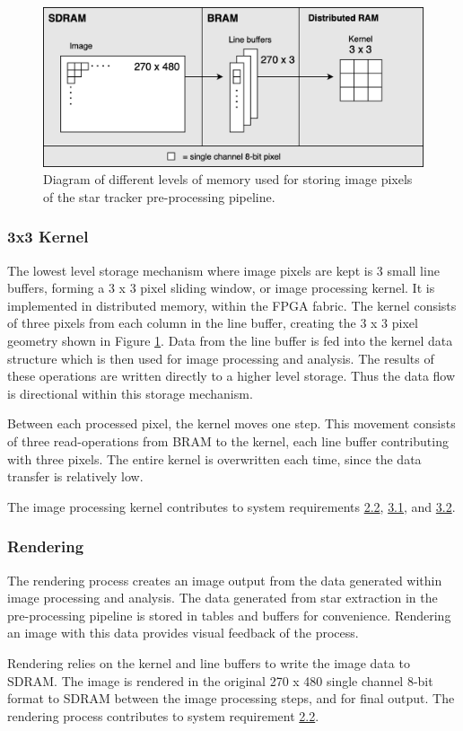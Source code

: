 \documentclass[12pt]{report}
\begin{document}
\begin{figure}[h]
    \centering
    \includegraphics[scale=0.3]{figures/mem_overview.png}
    \caption{Diagram of different levels of memory used for storing image pixels of the star tracker pre-processing pipeline.}
    \label{fig:mem_overview}
\end{figure}

\subsubsection{3x3 Kernel}
The lowest level storage mechanism where image pixels are kept is 3 small line buffers, forming a 3 x 3 pixel sliding window, or image processing kernel. It is implemented in distributed memory, within the FPGA fabric. The kernel consists of three pixels from each column in the line buffer, creating the 3 x 3 pixel geometry shown in Figure \ref*{fig:mem_overview}. Data from the line buffer is fed into the kernel data structure which is then used for image processing and analysis. The results of these operations are written directly to a higher level storage. Thus the data flow is directional within this storage mechanism.
\par
Between each processed pixel, the kernel moves one step. This movement consists of three read-operations from BRAM to the kernel, each line buffer contributing with three pixels. The entire kernel is overwritten each time, since the data transfer is relatively low.
\par
The image processing kernel contributes to system requirements \hyperref[req2.2]{2.2}, \hyperref[req3.1]{3.1}, and \hyperref[req3.2]{3.2}.

\subsubsection{Rendering}
The rendering process creates an image output from the data generated within image processing and analysis. The data generated from star extraction in the pre-processing pipeline is stored in tables and buffers for convenience. Rendering an image with this data provides visual feedback of the process.
\par
Rendering relies on the kernel and line buffers to write the image data to SDRAM. The image is rendered in the original 270 x 480 single channel 8-bit format to SDRAM between the image processing steps, and for final output. The rendering process contributes to system requirement \hyperref[req2.2]{2.2}.
\end{document}
